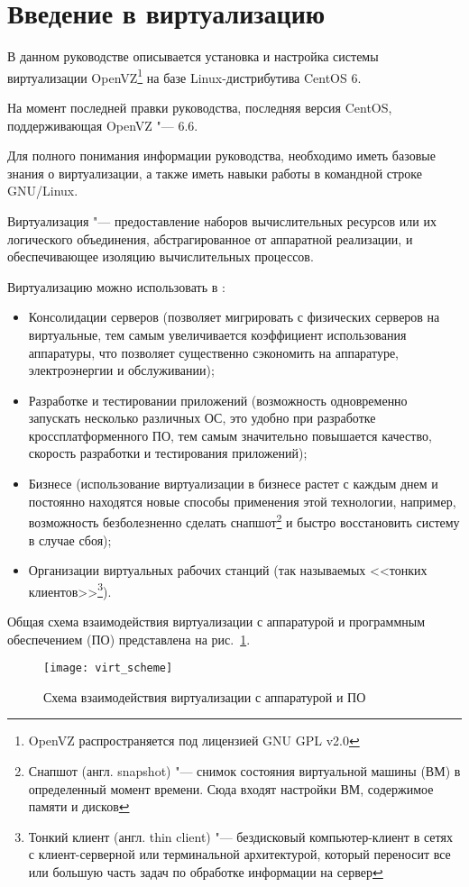 \section{Введение в виртуализацию}

В данном руководстве описывается установка и настройка системы виртуализации OpenVZ\footnote{OpenVZ распространяется под лицензией GNU GPL v2.0} 
на базе Linux-дистрибутива CentOS 6.

На момент последней правки руководства, последняя версия CentOS, поддерживающая OpenVZ "--- 6.6.

Для полного понимания информации руководства, необходимо иметь базовые знания о виртуализации, а также иметь навыки работы в командной строке GNU/Linux.

Виртуализация "--- предоставление наборов вычислительных ресурсов или их логического объединения, абстрагированное от аппаратной реализации, и обеспечивающее изоляцию вычислительных процессов. 

Виртуализацию можно использовать в \cite{sevconf2014}:
\begin{itemize}
    \item Консолидации серверов (позволяет мигрировать с физических серверов на виртуальные, тем самым увеличивается коэффициент использования аппаратуры, что позволяет существенно сэкономить на аппаратуре, электроэнергии и обслуживании);
    \item Разработке и тестировании приложений (возможность одновременно запускать несколько различных ОС, это удобно при разработке кроссплатформенного ПО, тем самым значительно повышается качество, скорость разработки и тестирования приложений);
    \item Бизнесе (использование виртуализации в бизнесе растет с каждым днем и постоянно находятся новые способы применения этой технологии, например, возможность безболезненно сделать снапшот\footnote{Снапшот (англ. snapshot) "--- снимок состояния виртуальной машины (ВМ) в определенный момент времени. Сюда входят настройки ВМ, содержимое памяти и дисков} и быстро восстановить систему в случае сбоя);
    \item Организации виртуальных рабочих станций (так называемых <<тонких клиентов>>\footnote{Тонкий клиент (англ. thin client) "--- бездисковый компьютер-клиент в сетях с клиент-серверной или терминальной архитектурой, который переносит все или большую часть задач по обработке информации на сервер}).
\end{itemize}

Общая схема взаимодействия виртуализации с аппаратурой и программным обеспечением (ПО) представлена на рис.~\ref{pic:virt_scheme}.
\begin{figure}[ht]
    \centering
	\texttt{[image: virt\_scheme]}
	\caption{Схема взаимодействия виртуализации с аппаратурой и ПО}\label{pic:virt_scheme}
\end{figure}

